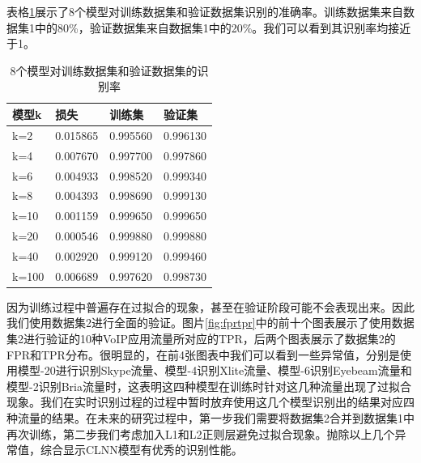 表格\ref{tab:acc4models}展示了8个模型对训练数据集和验证数据集识别的准确率。训练数据集来自数据集1中的80\%，验证数据集来自数据集1中的20\%。我们可以看到其识别率均接近于1。
\begin{table}
  \caption{8个模型对训练数据集和验证数据集的识别率}
  \label{tab:acc4models}
  \centering
  \begin{tabular}{l l l l}
    \hline
    \textbf{模型k} & \textbf{损失} & \textbf{训练集}&\textbf{验证集}\\
    \hline
    k=2      & 0.015865  & 0.995560  &0.996130  \\
    k=4      & 0.007670  & 0.997700  &0.997860 \\
    k=6      & 0.004933  & 0.998520  &0.999340 \\
    k=8      & 0.004393  & 0.998690  &0.999130 \\
    k=10     & 0.001159  & 0.999650  &0.999650  \\
    k=20     & 0.000546  & 0.999880  &0.999880 \\
    k=40     & 0.002920  & 0.999120  &0.999460  \\
    k=100    & 0.006689  & 0.997620  &0.998730  \\
    \hline
  \end{tabular}
\end{table}

因为训练过程中普遍存在过拟合的现象，甚至在验证阶段可能不会表现出来。因此我们使用数据集2进行全面的验证。图片\ref{fig:fprtpr}中的前十个图表展示了使用数据集2进行验证的10种VoIP应用流量所对应的TPR，后两个图表展示了数据集2的FPR和TPR分布。很明显的，在前4张图表中我们可以看到一些异常值，分别是使用模型-20进行识别Skype流量、模型-4识别Xlite流量、模型-6识别Eyebeam流量和模型-2识别Bria流量时，这表明这四种模型在训练时针对这几种流量出现了过拟合现象。我们在实时识别过程的过程中暂时放弃使用这几个模型识别出的结果对应四种流量的结果。在未来的研究过程中，第一步我们需要将数据集2合并到数据集1中再次训练，第二步我们考虑加入L1和L2正则层避免过拟合现象。抛除以上几个异常值，综合显示CLNN模型有优秀的识别性能。


